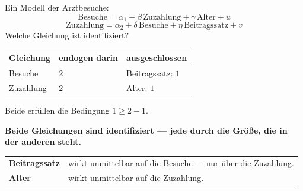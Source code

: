 \begin{aufgabe}
Ein Modell der Arztbesuche:
\[ \text{Besuche} = \alpha_1 - \beta\,\text{Zuzahlung} + \gamma\,\text{Alter} + u \]
\[ \text{Zuzahlung} = \alpha_2 + \delta\,\text{Besuche} + \eta\,\text{Beitragssatz} + v \]
Welche Gleichung ist identifiziert?

\loesung
{}
\begin{center}
{\small
\renewcommand{\arraystretch}{1.48}
\begin{tabular}{@{}P{2.4cm}P{2.6cm}P{2.6cm}@{}}
\toprule
\textbf{Gleichung} & \textbf{endogen darin} & \textbf{ausgeschlossen}\\
\midrule
Besuche & $2$ & Beitragssatz: $1$\\
Zuzahlung & $2$ & Alter: $1$\\
\bottomrule
\end{tabular}}
\end{center}
Beide erfüllen die Bedingung $1 \ge 2-1$.

\begin{center}
\begin{minipage}{0.9\textwidth}
\textbf{Beide Gleichungen sind identifiziert --- jede durch die Größe, die in der anderen steht.}
\end{minipage}
\end{center}

\begin{center}
{\small
\renewcommand{\arraystretch}{1.5}
\begin{tabular}{@{}P{2.8cm}P{5.8cm}@{}}
\toprule
\textbf{Beitragssatz} & wirkt  unmittelbar auf die Besuche --- nur über die Zuzahlung.\\
\textbf{Alter} & wirkt  unmittelbar auf die Zuzahlung.\\
\bottomrule
\end{tabular}}
\end{center}

\begin{center}
\begin{minipage}{0.88\textwidth}
\end{minipage}
\end{center}
\end{aufgabe}

